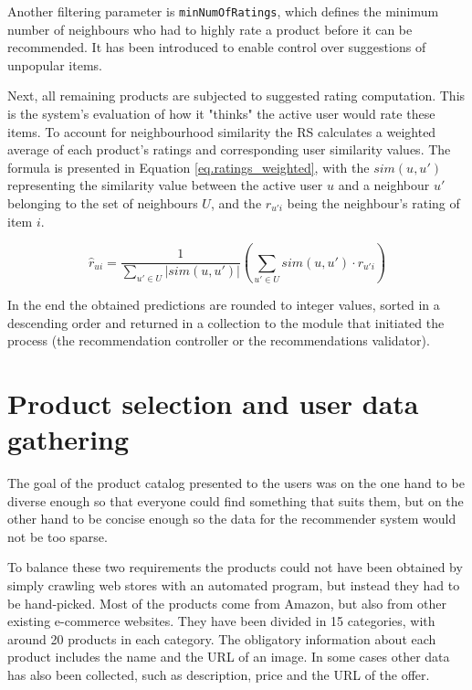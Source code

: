 \documentclass[12pt]{report}
\begin{document}
Another filtering parameter is \texttt{minNumOfRatings}, which defines the minimum number of neighbours who had to highly rate a product before it can be recommended. It has been introduced to enable control over suggestions of unpopular items. 

Next, all remaining products are subjected to suggested rating computation. This is the system's evaluation of how it "thinks" the active user would rate these items. To account for neighbourhood similarity the RS calculates a weighted average of each product's ratings and corresponding user similarity values. The formula is presented in Equation \ref{eq.ratings_weighted}, with the $sim(u,u')$ representing the similarity value between the active user $u$ and a neighbour $u'$ belonging to the set of neighbours $U$, and the $r_{u'i}$ being the neighbour's rating of item $i$.

\begin{equation}
\hat{r}_{ui} = \frac{1}{\displaystyle\sum_{u' \in U} |sim(u,u')|} \left(\displaystyle\sum_{u' \in U} sim(u,u')\cdot r_{u'i}\right)
\label{eq.ratings_weighted}
\end{equation}

In the end the obtained predictions are rounded to integer values, sorted in a descending order and returned in a collection to the module that initiated the process (the recommendation controller or the recommendations validator).







\section{Product selection and user data gathering}
The goal of the product catalog presented to the users was on the one hand to be diverse enough so that everyone could find something that suits them, but on the other hand to be concise enough so the data for the recommender system would not be too sparse.

To balance these two requirements the products could not have been obtained by simply crawling web stores with an automated program, but instead they had to be hand-picked. Most of the products come from Amazon, but also from other existing e-commerce websites. They have been divided in 15 categories, with around 20 products in each category. The obligatory information about each product includes the name and the URL of an image. In some cases other data has also been collected, such as description, price and the URL of the offer.
\end{document}
